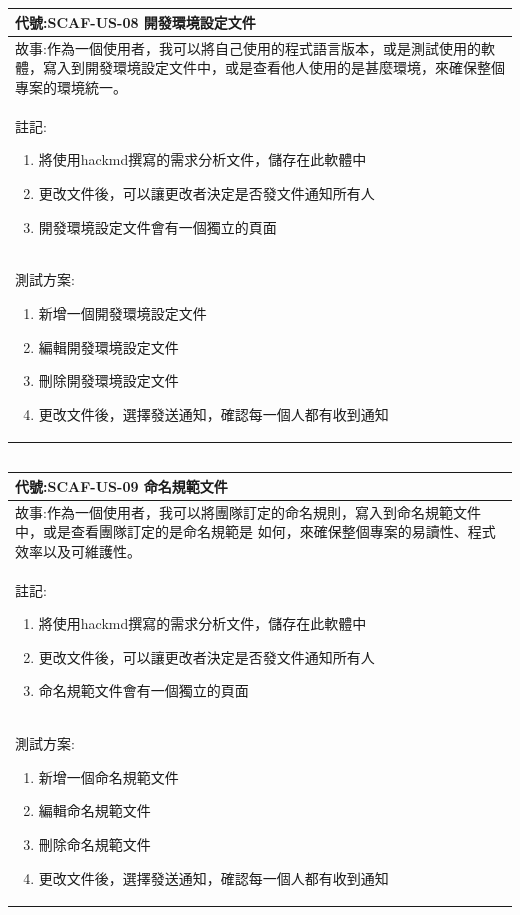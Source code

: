 \documentclass{report}
\begin{document}
\subsection*{}
\fontsize{12}{20}\selectfont
\begin{tabularx}{\textwidth}{|X|}
  \hline
  代號:SCAF-US-08 開發環境設定文件 \\
  \hline
  故事:作為一個使用者，我可以將自己使用的程式語言版本，或是測試使用的軟體，寫入到開發環境設定文件中，或是查看他人使用的是甚麼環境，來確保整個專案的環境統一。 \\
  \hline
  註記:
  \begin{enumerate}
    \item 將使用hackmd撰寫的需求分析文件，儲存在此軟體中
    \item 更改文件後，可以讓更改者決定是否發文件通知所有人
    \item 開發環境設定文件會有一個獨立的頁面
  \end{enumerate} \\
  \hline
  測試方案:
  \begin{enumerate}
    \item 新增一個開發環境設定文件
    \item 編輯開發環境設定文件
    \item 刪除開發環境設定文件
    \item 更改文件後，選擇發送通知，確認每一個人都有收到通知
  \end{enumerate} \\
  \hline
\end{tabularx}

\subsection*{}
\fontsize{12}{20}\selectfont
\begin{tabularx}{\textwidth}{|X|}
  \hline
  代號:SCAF-US-09 命名規範文件 \\
  \hline
  故事:作為一個使用者，我可以將團隊訂定的命名規則，寫入到命名規範文件中，或是查看團隊訂定的是命名規範是
  如何，來確保整個專案的易讀性、程式效率以及可維護性。 \\
  \hline
  註記:
  \begin{enumerate}
    \item 將使用hackmd撰寫的需求分析文件，儲存在此軟體中
    \item 更改文件後，可以讓更改者決定是否發文件通知所有人
    \item 命名規範文件會有一個獨立的頁面
  \end{enumerate} \\
  \hline
  測試方案:
  \begin{enumerate}
    \item 新增一個命名規範文件
    \item 編輯命名規範文件
    \item 刪除命名規範文件
    \item 更改文件後，選擇發送通知，確認每一個人都有收到通知
  \end{enumerate} \\
  \hline
\end{tabularx}
\end{document}
